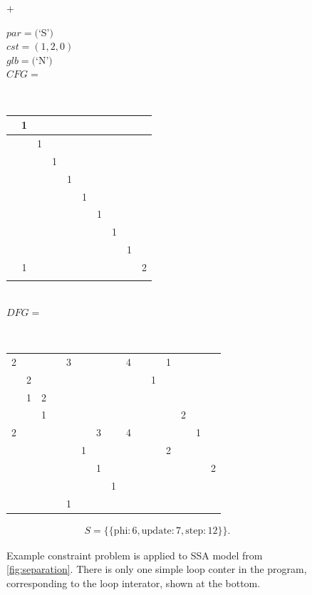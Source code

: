 \begin{figure}
\begin{minipage}{0.04\textwidth}
\centering
$+$
\end{minipage}
\begin{minipage}{0.27\textwidth}
$par=($`S'$)$\\
$cst=(1,2,0)$\\
$glb=($`N'$)$\\
$CFG=$\\[1pt]{
\tiny\tt\bf
\setlength{\tabcolsep}{1pt}
\renewcommand{\arraystretch}{0.7}
\begin{tabular}{|c|c|c|c|c|c|c|c|c|c|}
\hline
\hphantom{1}&1&&&&&&&&\\[-0.5mm]
\hline
&&1&&&&&&&\\[-0.5mm]
\hline
&&&1&&&&&&\\[-0.5mm]
\hline
&&&&1&&&&&\\[-0.5mm]
\hline
&&&&&1&&&&\\[-0.5mm]
\hline
&&&&&&1&&&\\[-0.5mm]
\hline
&&&&&&&1&&\\[-0.5mm]
\hline
&&&&&&&&1&\\[-0.5mm]
\hline
&1&&&&&&&&2\\[-0.5mm]
\hline
&&&&&&&&&\\
\hline
\end{tabular}}\\[0.75em]
$DFG=$\\[1pt]{
\tiny\tt\bf
\setlength{\tabcolsep}{1pt}
\renewcommand{\arraystretch}{0.7}
\begin{tabular}{|c|c|c|c|c|c|c|c|c|c||c||c|c|c||c|}
\hline
\hphantom{1}&&&\hphantom{1}&&&&&\hphantom{1}&\hphantom{1}&&&&&\\
\hline
2&&&&3&&&&4&&&1&&&\\[-0.5mm]
\hline
&2&&&&&&&&&1&&&&\\[-0.5mm]
\hline
&1&2&&&&&&&&&&&&\\[-0.5mm]
\hline
&&1&&&&&&&&&&2&&\\[-0.5mm]
\hline
2&&&&&&3&&4&&&&&1&\\[-0.5mm]
\hline
&&&&&1&&&&&&2&&&\\[-0.5mm]
\hline
&&&&&&1&&&&&&&&2\\[-0.5mm]
\hline
&&&&&&&1&&&&&&&\\[-0.5mm]
\hline
&&&&1&&&&&&&&&&\\
\hline
\end{tabular}}
\end{minipage}

\begin{align*}
S=\{\{\text{phi}:6,\text{update}:7,\text{step}:12\}\}.
\end{align*}

\caption{Example constraint problem is applied to SSA model from
         \autoref{fig:separation}.
         There is only one simple loop conter in the program, corresponding to
         the loop interator, shown at the bottom.}
\end{figure}

